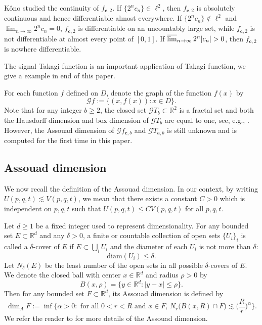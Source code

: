 \documentclass{amsart}
\theoremstyle{definition}
\theoremstyle{remark}
\numberwithin{equation}{section}
\def\R{\mathbb{R}}
\def\g{\mathcal{G}}
\def\bfc{\mathbf{c}}
\begin{document}
Kôno \cite{K87} studied the continuity of $f_{\bfc,2}$.
If $\{2^n c_n\} \in \ell^2$, then $f_{\bfc,2}$ is absolutely continuous and hence differentiable almost everywhere.
If $\{2^n c_n\} \notin \ell^2$ and $\lim_{n \to \infty} 2^n c_n=0$, 
$f_{\bfc,2}$ is differentiable on an uncountably large set, while
$f_{\bfc,2}$ is not differentiable at almost
every point of $[0, 1]$.
If $\varlimsup_{n \to \infty }2^n|c_n| > 0$, then $f_{\bfc,2}$ is nowhere differentiable.

The signal Takagi function \cite{A13} is an important application of Takagi function, we give a example in end of this paper.



For each function $f$ defined on $D$, denote the graph of the function $f(x)$ by
$$
\g f:=\{(x,f(x)): x \in D\}.
$$
Note that for any integer $b \geq2$, the closed set $\g T_b\subset\mathbb{R}^2$ is a fractal set and both the Hausdorff dimension and box dimension of $\g T_b$ are equal to one, see, e.g., \cite{B15,KMY84}. However, the Assouad dimension of $\g f_{\bfc,b}$ and $\g T_{a,b}$ is still unknown and is computed for the first time in this paper.


\subsection{Assouad dimension}
We now recall the definition of the Assouad dimension. In our context, by writing $U(p,q,t)\lesssim V(p,q,t)$, we mean that there exists a constant $C>0$ which is independent on $p,q,t$ such that $U(p,q,t)\leq CV(p,q,t)$ for all $p,q,t$.

Let $d\geq1$ be a fixed integer used to represent dimensionality.
For any bounded set $E\subset\mathbb{R}^d$ and any $\delta>0$, a finite or countable collection of open sets $\{U_i\}_i$ is called a $\delta$-cover of $E$ if $E\subset\bigcup_{i} U_i$ and the diameter of each $U_i$ is not more than $\delta$: 
$$
	\mathrm{diam}(U_i)\leq\delta.
$$
Let $N_\delta(E)$ be the least number of the open sets in all possible $\delta$-covers of $E$. We denote the closed ball with center $x \in \R^d$ and radius $\rho>0$ by
$$B(x,\rho)=\{y \in \R^d : |y- x| \leq \rho\}.$$
Then for any bounded set $F\subset\mathbb{R}^d$, its Assouad dimension is defined by
$$
\dim_A F:=\inf\Big\{\alpha>0:\mbox{ for all }0<r<R\mbox{ and }x\in F,\,N_r\big(B(x,R)\cap F\big)\lesssim\Big(\frac{R}{r}\Big)^\alpha\Big\}.
$$
We refer the reader to \cite{F21} for more details of the Assouad dimension.
\end{document}

